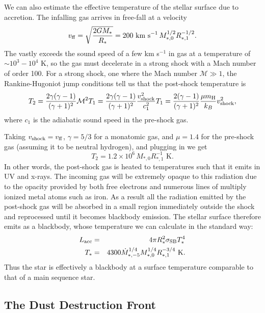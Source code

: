 We can also estimate the effective temperature of the stellar surface due to accretion. The infalling gas arrives in free-fall at a velocity 
\begin{equation}
v_{\rm ff}=\sqrt{\frac{2GM_*}{R_*}} = 200\mbox{ km s}^{-1} \, M_{*,0}^{1/2} R_{*,1}^{-1/2}.
\end{equation}
The vastly exceeds the sound speed of a few km s$^{-1}$ in gas at a temperature of $\sim 10^3-10^4$ K, so the gas must decelerate in a strong shock with a Mach number of order 100. For a strong shock, one where the Mach number $\mathcal{M} \gg 1$, the Rankine-Hugoniot jump conditions tell us that the post-shock temperature is
\begin{equation}
T_2 = \frac{2\gamma(\gamma-1)}{(\gamma+1)^2} \mathcal{M}^2 T_1
= \frac{2\gamma(\gamma-1)}{(\gamma+1)^2} \frac{v_{\rm shock}^2}{c_1^2} T_1
= \frac{2(\gamma-1)}{(\gamma+1)^2} \frac{\mu m_{\rm H}}{k_B} v_{\rm shock}^2,
\end{equation}
where $c_1$ is the adiabatic sound speed in the pre-shock gas.

Taking $v_{\rm shock}=v_{\rm ff}$, $\gamma=5/3$ for a monatomic gas, and $\mu=1.4$ for the pre-shock gas (assuming it to be neutral hydrogen), and plugging in we get
\begin{equation}
T_2 = 1.2\times 10^6 \, M_{*,0} R_{*,1}^{-1} \mbox{ K}.
\end{equation}
In other words, the post-shock gas is heated to temperatures such that it emits in UV and x-rays. The incoming gas will be extremely opaque to this radiation due to the opacity provided by both free electrons and numerous lines of multiply ionized metal atoms such as iron. As a result all the radiation emitted by the post-shock gas will be absorbed in a small region immediately outside the shock and reprocessed until it becomes blackbody emission. The stellar surface therefore emits as a blackbody, whose temperature we can calculate in the standard way:
\begin{eqnarray}
L_{\rm acc} & = & 4\pi R_*^2 \sigma_{\rm SB} T_*^4 \\
T_* & = & 4300 \dot{M}_{*,-5}^{1/4} M_{*,0}^{1/4} R_{*,1}^{-3/4} \mbox{ K}.
\end{eqnarray}
Thus the star is effectively a blackbody at a surface temperature comparable to that of a main sequence star.

\subsection{The Dust Destruction Front}

